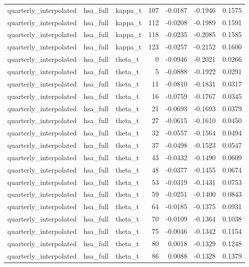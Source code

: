 \begin{tabular}{lllrrrr}
quarterly\_interpolated & hsa\_full & kappa\_t & 107 & -0.0187 & -0.1946 & 0.1575 \\
quarterly\_interpolated & hsa\_full & kappa\_t & 112 & -0.0208 & -0.1989 & 0.1591 \\
quarterly\_interpolated & hsa\_full & kappa\_t & 118 & -0.0235 & -0.2085 & 0.1585 \\
quarterly\_interpolated & hsa\_full & kappa\_t & 123 & -0.0257 & -0.2152 & 0.1600 \\
quarterly\_interpolated & hsa\_full & theta\_t & 0 & -0.0946 & -0.2021 & 0.0266 \\
quarterly\_interpolated & hsa\_full & theta\_t & 5 & -0.0888 & -0.1922 & 0.0291 \\
quarterly\_interpolated & hsa\_full & theta\_t & 11 & -0.0810 & -0.1831 & 0.0317 \\
quarterly\_interpolated & hsa\_full & theta\_t & 16 & -0.0759 & -0.1767 & 0.0345 \\
quarterly\_interpolated & hsa\_full & theta\_t & 21 & -0.0693 & -0.1693 & 0.0379 \\
quarterly\_interpolated & hsa\_full & theta\_t & 27 & -0.0615 & -0.1610 & 0.0450 \\
quarterly\_interpolated & hsa\_full & theta\_t & 32 & -0.0557 & -0.1564 & 0.0494 \\
quarterly\_interpolated & hsa\_full & theta\_t & 37 & -0.0498 & -0.1523 & 0.0547 \\
quarterly\_interpolated & hsa\_full & theta\_t & 43 & -0.0432 & -0.1490 & 0.0609 \\
quarterly\_interpolated & hsa\_full & theta\_t & 48 & -0.0377 & -0.1455 & 0.0674 \\
quarterly\_interpolated & hsa\_full & theta\_t & 53 & -0.0319 & -0.1431 & 0.0753 \\
quarterly\_interpolated & hsa\_full & theta\_t & 59 & -0.0251 & -0.1400 & 0.0843 \\
quarterly\_interpolated & hsa\_full & theta\_t & 64 & -0.0185 & -0.1375 & 0.0931 \\
quarterly\_interpolated & hsa\_full & theta\_t & 70 & -0.0109 & -0.1364 & 0.1038 \\
quarterly\_interpolated & hsa\_full & theta\_t & 75 & -0.0046 & -0.1342 & 0.1154 \\
quarterly\_interpolated & hsa\_full & theta\_t & 80 & 0.0018 & -0.1329 & 0.1248 \\
quarterly\_interpolated & hsa\_full & theta\_t & 86 & 0.0088 & -0.1328 & 0.1379 \\

\end{tabular}
